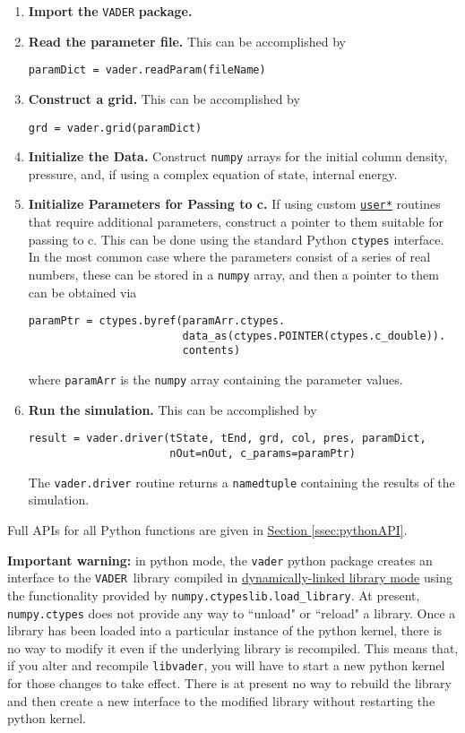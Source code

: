\documentclass[12pt]{article}
\newcommand{\vader}{\texttt{VADER}}
\begin{document}
\begin{enumerate}
\item \textbf{Import the} \texttt{VADER} \textbf{package.}
\item \textbf{Read the parameter file.} This can be accomplished by
\begin{verbatim}
paramDict = vader.readParam(fileName)
\end{verbatim}
\item \textbf{Construct a grid.} This can be accomplished by
\begin{verbatim}
grd = vader.grid(paramDict)
\end{verbatim}
\item \textbf{Initialize the Data.} Construct \verb=numpy= arrays for the initial column density, pressure, and, if using a complex equation of state, internal energy.
\item \textbf{Initialize Parameters for Passing to c.} If using custom \hyperref[ssec:userC]{\texttt{user*}} routines that require additional parameters, construct a pointer to them suitable for passing to c. This can be done using the standard Python \verb=ctypes= interface. In the most common case where the parameters consist of a series of real numbers, these can be stored in a \verb=numpy= array, and then a pointer to them can be obtained via
\begin{verbatim}
paramPtr = ctypes.byref(paramArr.ctypes.
                        data_as(ctypes.POINTER(ctypes.c_double)).
                        contents)
\end{verbatim}
where \verb=paramArr= is the \verb=numpy= array containing the parameter values.
\item \textbf{Run the simulation.} This can be accomplished by
\begin{verbatim}
result = vader.driver(tState, tEnd, grd, col, pres, paramDict,
                      nOut=nOut, c_params=paramPtr)
\end{verbatim}
The \verb=vader.driver= routine returns a \verb=namedtuple= containing the results of the simulation.
\end{enumerate}
Full APIs for all Python functions are given in \hyperref[ssec:pythonAPI]{Section \ref{ssec:pythonAPI}}.

\textbf{Important warning:} in python mode, the \texttt{vader} python package creates an interface to the \vader\ library compiled in \hyperref[ssec:dylibmode]{dynamically-linked library mode} using the functionality provided by \verb=numpy.ctypeslib.load_library=. At present, \verb=numpy.ctypes= does not provide any way to ``unload" or ``reload" a library. Once a library has been loaded into a particular instance of the python kernel, there is no way to modify it even if the underlying library is recompiled. This means that, if you alter and recompile \texttt{libvader}, you will have to start a new python kernel for those changes to take effect. There is at present no way to rebuild the library and then create a new interface to the modified library without restarting the python kernel.
\end{document}
